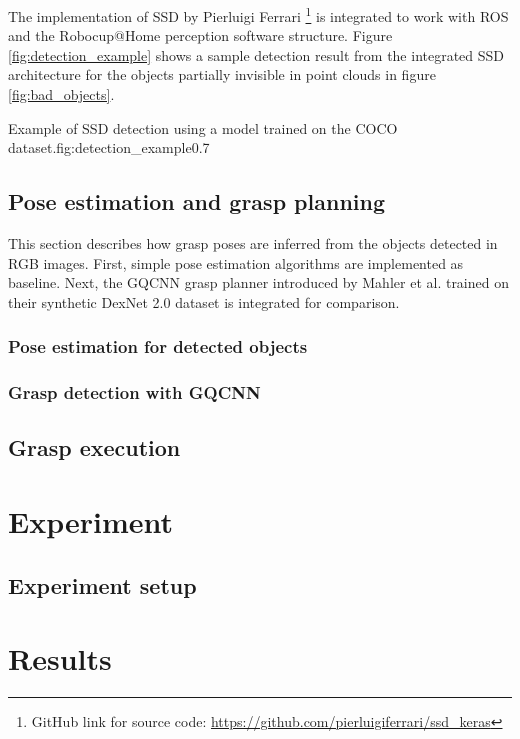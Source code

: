 The implementation of SSD by Pierluigi Ferrari \footnote{GitHub link for source code: 
    \url{https://github.com/pierluigiferrari/ssd_keras}} is integrated to work with ROS and the Robocup@Home perception
software structure. 
Figure \ref{fig:detection_example} shows a sample detection result from the integrated SSD architecture for the objects
partially invisible in point clouds in figure \ref{fig:bad_objects}.

             {Example of SSD detection using a model trained on the COCO dataset.}{fig:detection_example}{0.7\textwidth}

\subsection{Pose estimation and grasp planning}

This section describes how grasp poses are inferred from the objects detected in RGB images. First, simple pose
estimation algorithms are implemented as baseline. Next, the GQCNN grasp planner introduced by Mahler et al.
\cite{mahler2017} trained on their synthetic DexNet 2.0 dataset is integrated for comparison.

\subsubsection*{Pose estimation for detected objects}

\subsubsection*{Grasp detection with GQCNN}

\subsection{Grasp execution}

\pagebreak
\section{Experiment}


\subsection{Experiment setup}


\section{Results}

